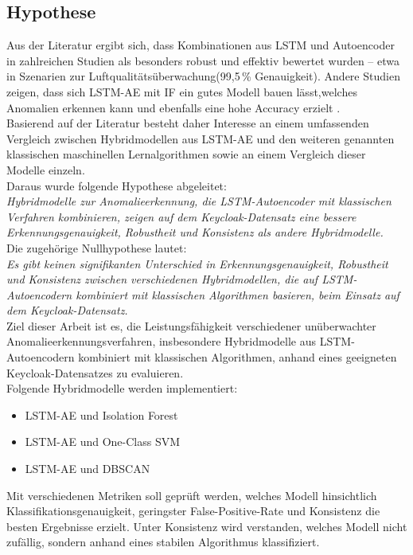 \documentclass[a4paper,12pt]{article}
\begin{document}
	\subsection{Hypothese}
	Aus der Literatur ergibt sich, dass Kombinationen aus LSTM und Autoencoder in zahlreichen Studien als besonders robust und effektiv bewertet wurden – etwa in Szenarien zur Luftqualitätsüberwachung(99{,}5\,\% Genauigkeit)\cite{wei2023lstm}.
	Andere Studien zeigen, dass sich LSTM-AE mit IF ein gutes Modell bauen lässt,welches Anomalien erkennen kann und ebenfalls eine hohe Accuracy erzielt \cite{tran2020lstm_if}.
	\\[0.5em]
	Basierend auf der Literatur besteht daher Interesse an einem umfassenden Vergleich zwischen Hybridmodellen aus LSTM-AE und den weiteren genannten klassischen maschinellen Lernalgorithmen sowie an einem Vergleich dieser Modelle einzeln.
	\\[0.5em]
	Daraus wurde folgende Hypothese abgeleitet:
	\\[0.5em]
	\textit{Hybridmodelle zur Anomalieerkennung, die LSTM-Autoencoder mit klassischen Verfahren kombinieren, zeigen auf dem Keycloak-Datensatz eine bessere Erkennungsgenauigkeit, Robustheit und Konsistenz als andere Hybridmodelle.}
	\\[0.5em]
	Die zugehörige Nullhypothese lautet:
	\\[0.5em]
	\textit{Es gibt keinen signifikanten Unterschied in Erkennungsgenauigkeit, Robustheit und Konsistenz zwischen verschiedenen Hybridmodellen, die auf LSTM-Autoencodern kombiniert mit klassischen Algorithmen basieren, beim Einsatz auf dem Keycloak-Datensatz.}
	\\[0.5em]
	Ziel dieser Arbeit ist es, die Leistungsfähigkeit verschiedener unüberwachter Anomalieerkennungsverfahren, insbesondere Hybridmodelle aus LSTM-Autoencodern kombiniert mit klassischen Algorithmen, anhand eines geeigneten Keycloak-Datensatzes zu evaluieren.
	\\[0.5em]
	Folgende Hybridmodelle werden implementiert:
	\begin{itemize}
		\item LSTM-AE und Isolation Forest
		\item LSTM-AE und One-Class SVM
		\item LSTM-AE und DBSCAN
	\end{itemize}
	Mit verschiedenen Metriken soll geprüft werden, welches Modell hinsichtlich Klassifikationsgenauigkeit, geringster False-Positive-Rate und Konsistenz die besten Ergebnisse erzielt. Unter Konsistenz wird verstanden, welches Modell nicht zufällig, sondern anhand eines stabilen Algorithmus klassifiziert.
\end{document}
